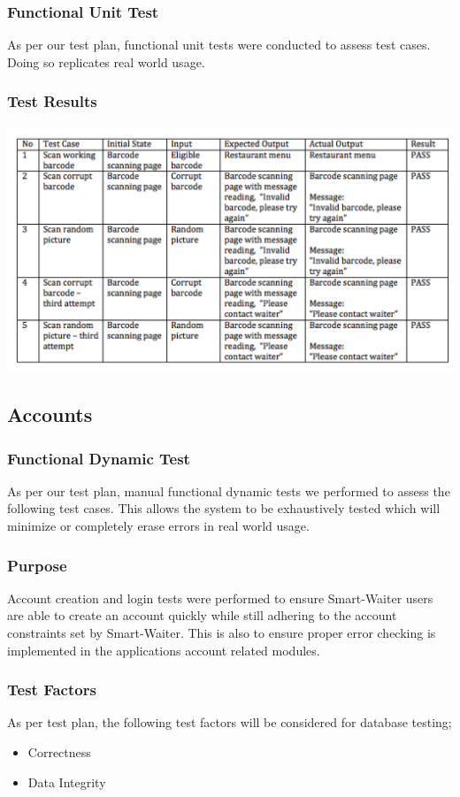 \documentclass[12pt, titlepage]{article}
\begin{document}
\subsubsection{Functional Unit Test}
As per our test plan, functional unit tests were  conducted to assess test cases. Doing so replicates real world usage.

\subsubsection{Test Results}
\includegraphics[width=1.2\textwidth]{barcodeTable.png}

\subsection{Accounts}
\subsubsection{Functional Dynamic Test}
As per our test plan, manual functional dynamic tests we performed to assess the following test cases. This allows the system to be exhaustively tested which will minimize or completely erase errors in real world usage.
\subsubsection{Purpose}
Account creation and login tests were performed to ensure Smart-Waiter users are able to create an account quickly while still adhering to the account constraints set by Smart-Waiter. This is also to ensure proper error checking is implemented in the applications account related modules.
\subsubsection{Test Factors}
As per test plan, the following test factors will be considered for database testing;
\begin{itemize}
 \item Correctness
 \item Data Integrity
 \end{itemize}
\end{document}

